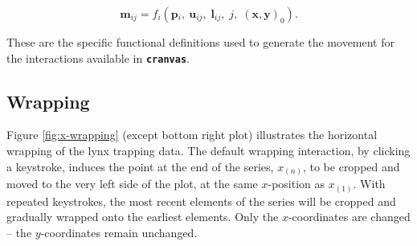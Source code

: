 \documentclass[12pt]{article}
\begin{document}
\[
\mathbf{m}{}_{ij}=f_{i}(\mathbf{p}{}_{i},\:\mathbf{u}{}_{ij},\;\mathbf{l}_{ij},\; j,\; (\mathbf{x},\mathbf{y})_{0} ).
\]

\noindent These are the specific functional definitions used to generate the movement for the interactions available in \texttt{\textbf{cranvas}}.


\subsection{Wrapping}

Figure \ref{fig:x-wrapping} (except bottom right plot)
illustrates the horizontal wrapping of the lynx trapping data.
The default wrapping interaction, by clicking a keystroke,
induces the point at the end of the series, $x_{(n)}$, to be
cropped and moved to the very left side of the plot, at the
same $x$-position as $x_{(1)}$. With repeated keystrokes, the
most recent elements of the series will be cropped and gradually
wrapped onto the earliest elements. Only the $x$-coordinates
are changed -- the $y$-coordinates remain unchanged.
\end{document}
